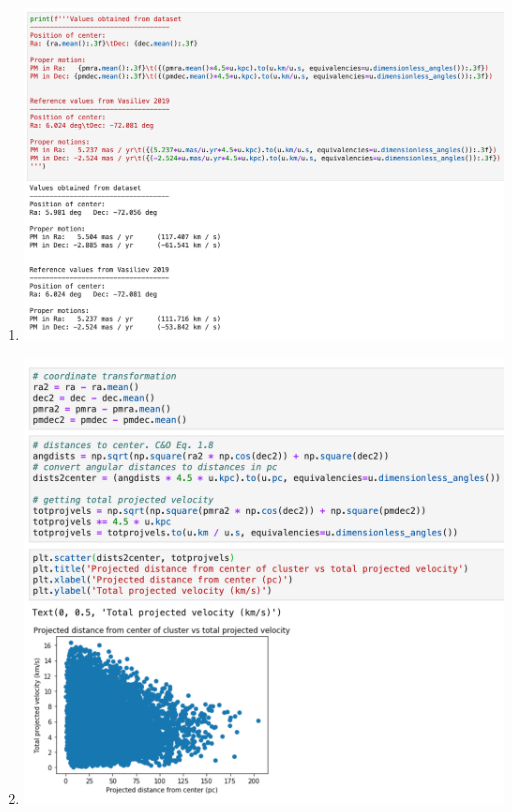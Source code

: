 \documentclass[11pt,letterpaper]{article}
\begin{document}
\begin{enumerate}[label=(\roman*)]
\begin{parbox}{\linewidth}
{\begin{minipage}[b]{0.45\textwidth}
                \end{minipage}
            }
        \end{parbox}

    \item \hfill

        \begin{parbox}{\linewidth}{
                \centering
                \includegraphics[width=0.9\linewidth]{figures/q22.png}
            }
        \end{parbox}

    \item \hfill

        \begin{parbox}{\linewidth}{
                \centering
                \includegraphics[width=0.8\linewidth]{figures/q23.png}
            }
        \end{parbox}


\end{enumerate}
\end{document}
